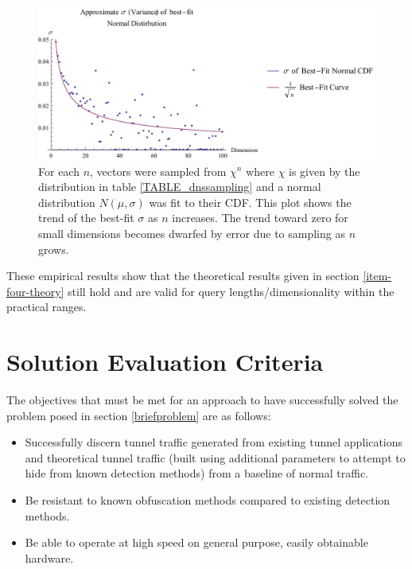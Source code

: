 \documentclass[12pt]{report}
\theoremstyle{remark}
\theoremstyle{definition}
\theoremstyle{definition}
\theoremstyle{definition}
\begin{document}
\begin{figure}
\centering
\includegraphics[width=\textwidth]{figures/dnssampling-sigmafit.pdf}
\caption[Trend of $\sigma$ of Best-Fit Normal Distribution of Sampled Expected Value]
{For each $n$, vectors were sampled from $\chi^n$ where $\chi$ is given by the
distribution in table \ref{TABLE_dnssampling} and a normal distribution
$N(\mu,\sigma)$ was fit to their CDF. This plot shows the trend of the best-fit
$\sigma$ as $n$ increases. The trend toward zero for small dimensions becomes
dwarfed by error due to sampling as $n$ grows.}
\label{dnssampling-sigmafit}
\end{figure}

These empirical results show that the theoretical results given in section
\ref{item-four-theory} still hold and are valid for query lengths/dimensionality
within the practical ranges.

\clearpage
\section{Solution Evaluation Criteria}

The objectives that must be met for an
approach to have successfully solved the problem posed in section
\ref{briefproblem} are as follows:

\label{methodreqs}
\begin{itemize}
\item Successfully discern tunnel traffic generated from
existing tunnel applications and theoretical tunnel traffic (built using
additional parameters to attempt to hide from known detection methods) from a
baseline of normal traffic.
\item Be resistant to known obfuscation methods compared to existing detection methods.
\item Be able to operate at high speed on general purpose, easily obtainable
hardware.
\end{itemize}
\end{document}
